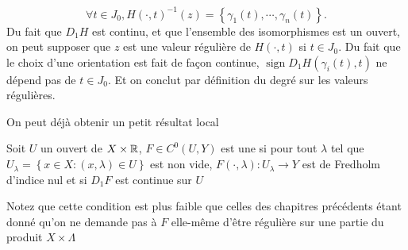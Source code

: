 \documentclass[memoire.tex]{subfiles}
\begin{document}
\begin{preuve}
    \begin{equation*}
        \forall t\in J_0,H(\cdot,t)^{-1}(z)=\left\{\gamma_1(t),\cdots,\gamma_n(t)\right\}.
    \end{equation*}
    Du fait que $D_1H$ est continu, et que l'ensemble des isomorphismes est un ouvert, on peut supposer que $z$ est une valeur régulière de $H(\cdot,t)$ si $t\in J_0$. Du fait que le choix d'une orientation est fait de façon continue, $\operatorname{sign}D_1 H(\gamma_i(t),t)$ ne dépend pas de $t\in J_0$. Et on conclut par définition du degré sur les valeurs régulières.
\end{preuve}

On peut déjà obtenir un petit résultat local

\begin{definition}
    Soit $U$ un ouvert de $X\times \mathbb{R}$, 
    $F\in C^0(U,Y)$ est une  
    si pour tout $\lambda$ tel que $U_{\lambda}
    =\left\{ x\in X: (x,\lambda)\in U\right\}$ est 
    non vide, $F(\cdot,\lambda): U_{\lambda}
    \rightarrow Y$ est de Fredholm d'indice nul et si 
    $D_1F$ est continue sur $U$
\end{definition}
\begin{remarque}
    Notez que cette condition est plus faible que celles des chapitres précédents étant donné qu'on ne demande pas à $F$ elle-même d'être régulière sur une partie du produit $X\times \Lambda$
\end{remarque}
\end{document}
